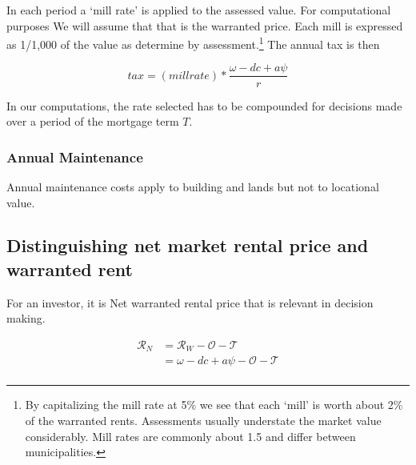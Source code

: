 In each  period a `mill rate' is applied to the assessed value. For computational purposes We will assume that that is the warranted price. Each mill is  expressed as  1/1,000 of the value as determine by assessment.\footnote{ By capitalizing the mill rate at 5\%  we see that each `mill' is worth about 2\% of the warranted rents. Assessments usually understate the market value considerably. Mill rates are commonly about 1.5 and differ between municipalities. } The annual tax is then

\[tax=(millrate)*\frac{\omega- {dc} + a\psi}{r}\]

In our computations, the rate selected has to be compounded for decisions made over a period of the mortgage term $T$.

\subsubsection{Annual Maintenance}
Annual maintenance costs apply to building and lands but not to locational value.


\subsection{Distinguishing net market rental price and warranted rent}






For an investor, it is Net warranted  rental price that is relevant in decision making. 


\begin{align}
\mathcal{R}_N &= \mathcal{R}_W - \mathcal{O} - \mathcal{T}\\
&= \omega - {dc} + a\psi -  \mathcal{O} - \mathcal{T} \\
\end{align}

